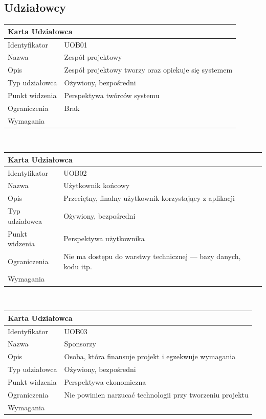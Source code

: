 \documentclass[a4paper,11pt]{report}
\begin{document}
\subsection {Udziałowcy}
\begin{tabular}{|p{3cm}|p{11cm}|}
	\hline
	\multicolumn{2}{|l|}{\textbf{Karta Udziałowca}}\\
	\hline
	Identyfikator&UOB01\\
	\hline
	Nazwa&Zespół projektowy\\
	\hline
	Opis&Zespół projektowy tworzy oraz opiekuje się systemem\\
	\hline
	Typ udziałowca&Ożywiony, bezpośredni\\
	\hline
	Punkt widzenia&Perspektywa twórców systemu\\
	\hline
	Ograniczenia&Brak\\
	\hline
	Wymagania&\\
	\hline
	\end{tabular}\\
	\begin{tabular}{|p{3cm}|p{11cm}|}
	\hline
	\multicolumn{2}{|l|}{\textbf{Karta Udziałowca}}\\
	\hline
	Identyfikator&UOB02\\
	\hline
	Nazwa&Użytkownik końcowy\\
	\hline
	Opis&Przeciętny, finalny użytkownik korzystający z aplikacji\\
	\hline
	Typ udziałowca&Ożywiony, bezpośredni\\
	\hline
	Punkt widzenia&Perspektywa użytkownika\\
	\hline
	Ograniczenia&Nie ma dostępu do warstwy technicznej — bazy danych, kodu itp.\\
	\hline
	Wymagania&\\
	\hline
	\end{tabular}\\
	\begin{tabular}{|p{3cm}|p{11cm}|}
	\hline
	\multicolumn{2}{|l|}{\textbf{Karta Udziałowca}}\\
	\hline
	Identyfikator&UOB03\\
	\hline
	Nazwa&Sponsorzy\\
	\hline
	Opis&Osoba, która finansuje projekt i egzekwuje wymagania\\
	\hline
	Typ udziałowca&Ożywiony, bezpośredni\\
	\hline
	Punkt widzenia&Perspektywa ekonomiczna\\
	\hline
	Ograniczenia&Nie powinien narzucać technologii przy tworzeniu projektu\\
	\hline
	Wymagania&\\
	\hline
	\end{tabular}\\
\end{document}

